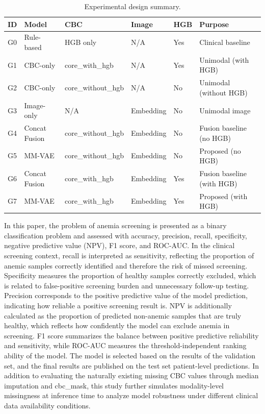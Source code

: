 \documentclass[conference]{IEEEtran}
\begin{document}
\begin{table}[t]
\caption{Experimental design summary.}
\label{tab:experiment-design}
\centering
\small
\begin{tabular}{p{}p{}p{}p{}p{}p{}}
\hline
\textbf{ID} & \textbf{Model} & \textbf{CBC} & \textbf{Image} & \textbf{HGB} & \textbf{Purpose} \\
\hline
G0 & Rule-based & HGB only & N/A & Yes & Clinical baseline \\
G1 & CBC-only & core\_with\_hgb & N/A & Yes & Unimodal (with HGB) \\
G2 & CBC-only & core\_without\_hgb & N/A & No & Unimodal (without HGB) \\
G3 & Image-only & N/A & Embedding & No & Unimodal image \\
G4 & Concat Fusion & core\_without\_hgb & Embedding & No & Fusion baseline (no HGB) \\
G5 & MM-VAE & core\_without\_hgb & Embedding & No & Proposed (no HGB) \\
G6 & Concat Fusion & core\_with\_hgb & Embedding & Yes & Fusion baseline (with HGB) \\
G7 & MM-VAE & core\_with\_hgb & Embedding & Yes & Proposed (with HGB) \\
\hline
\end{tabular}
\end{table}

In this paper, the problem of anemia screening is presented as a binary classification problem and assessed with accuracy, precision, recall, specificity, negative predictive value (NPV), F1 score, and ROC-AUC. In the clinical screening context, recall is interpreted as sensitivity, reflecting the proportion of anemic samples correctly identified and therefore the risk of missed screening. Specificity measures the proportion of healthy samples correctly excluded, which is related to false-positive screening burden and unnecessary follow-up testing. Precision corresponds to the positive predictive value of the model prediction, indicating how reliable a positive screening result is. NPV is additionally calculated as the proportion of predicted non-anemic samples that are truly healthy, which reflects how confidently the model can exclude anemia in screening. F1 score summarizes the balance between positive predictive reliability and sensitivity, while ROC-AUC measures the threshold-independent ranking ability of the model. The model is selected based on the results of the validation set, and the final results are published on the test set patient-level predictions. In addition to evaluating the naturally existing missing CBC values through median imputation and cbc\_mask, this study further simulates modality-level missingness at inference time to analyze model robustness under different clinical data availability conditions.
\end{document}
